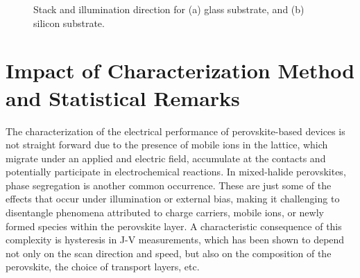 \begin{figure}[htbp]
    \caption{Stack and illumination direction for (a) glass substrate, and (b) silicon substrate.}
    \label{fig:ch2:types_of_stacks}
\end{figure}

\section{Impact of Characterization Method and Statistical Remarks}

The characterization of the electrical performance of perovskite-based devices is not straight forward due to the presence of mobile ions in the lattice, which migrate under an applied and electric field, accumulate at the contacts and potentially participate in electrochemical reactions. In mixed-halide perovskites, phase segregation is another common occurrence. These are just some of the effects that occur under illumination or external bias, making it challenging to disentangle phenomena attributed to charge carriers, mobile ions, or newly formed species within the perovskite layer. A characteristic consequence of this complexity is hysteresis in J-V measurements, which has been shown to depend not only on the scan direction and speed, but also on the composition of the perovskite, the choice of transport layers, etc. 

